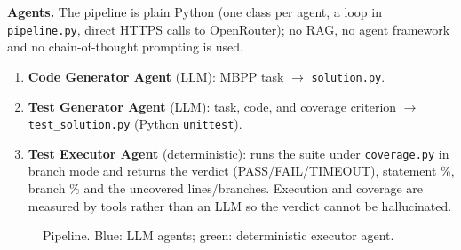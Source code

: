 \documentclass[11pt,a4paper]{article}
\begin{document}
\textbf{Agents.} The pipeline is plain Python (one class per agent, a loop in
\texttt{pipeline.py}, direct HTTPS calls to OpenRouter); no RAG, no agent framework
and no chain-of-thought prompting is used.
\begin{enumerate}
  \item \textbf{Code Generator Agent} (LLM): MBPP task $\rightarrow$ \texttt{solution.py}.
  \item \textbf{Test Generator Agent} (LLM): task, code, and coverage criterion
        $\rightarrow$ \texttt{test\_solution.py} (Python \texttt{unittest}).
  \item \textbf{Test Executor Agent} (deterministic): runs the suite under
        \texttt{coverage.py} in branch mode and returns the verdict
        (PASS/FAIL/TIMEOUT), statement \%, branch \% and the uncovered lines/branches.
        Execution and coverage are measured by tools rather than an LLM so the verdict cannot be hallucinated.
\end{enumerate}

\begin{figure}[H]
\centering
{}
\caption{Pipeline. Blue: LLM agents; green: deterministic executor agent.}
\end{figure}
\end{document}
